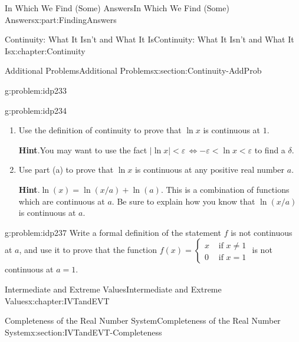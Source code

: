 \documentclass[oneside,10pt,]{book}
\newcommand{\blocktitlefont}{\relax}
\numberwithin{equation}{section}
\newcommand{\abs}[1]{\left|#1\right|}
\newcommand{\eps}{\varepsilon}
\newcommand{\lt}{<}
\newcommand{\amp}{&}
\begin{document}
\begin{partptx}{In Which We Find (Some) Answers}{}{In Which We Find (Some) Answers}{}{}{x:part:FindingAnswers}
\begin{chapterptx}{Continuity: What It Isn't and What It Is}{}{Continuity: What It Isn't and What It Is}{}{}{x:chapter:Continuity}
\begin{sectionptx}{Additional Problems}{}{Additional Problems}{}{}{x:section:Continuity-AddProb}
\begin{problem}{}{g:problem:idp233}
\end{problem}
\begin{problem}{}{g:problem:idp234}%
\begin{enumerate}[font=\bfseries,label=(\alph*),ref=\alph*]
\item{}Use the definition of continuity to prove that \(\ln x\) is continuous at \(1\).%
\par\smallskip%
\noindent\textbf{\blocktitlefont Hint}.\hypertarget{g:hint:idp235}{}\quad{}You may want to use the fact \(\abs{\ln x}\lt \eps\,\Leftrightarrow-\eps\lt \ln x\lt \eps\) to find a \(\delta\).%
\item{}Use part (a) to prove that \(\ln x\) is continuous at any positive real number \(a\).%
\par\smallskip%
\noindent\textbf{\blocktitlefont Hint}.\hypertarget{g:hint:idp236}{}\quad{}\(\ln(x)=\ln(x/a)+\ln(a)\). This is a combination of functions which are continuous at \(a\). Be sure to explain how you know that \(\ln(x/a)\) is continuous at \(a\).%
\end{enumerate}
\end{problem}
\begin{problem}{}{g:problem:idp237}%
 Write a formal definition of the statement \(f\) is not continuous at \(a\), and use it to prove that the function \(f(x)= \begin{cases}x\amp \text{ if } x\neq 1\\ 0\amp \text{ if } x=1 \end{cases}\) is not continuous at \(a=1\).%
\end{problem}
\end{sectionptx}
\end{chapterptx}
%
\typeout{************************************************}
\typeout{************************************************}
%
\begin{chapterptx}{Intermediate and Extreme Values}{}{Intermediate and Extreme Values}{}{}{x:chapter:IVTandEVT}
%
%
\typeout{************************************************}
\typeout{************************************************}
%
\begin{sectionptx}{Completeness of the Real Number System}{}{Completeness of the Real Number System}{}{}{x:section:IVTandEVT-Completeness}

\end{sectionptx}
\end{chapterptx}
\end{partptx}
\end{document}
